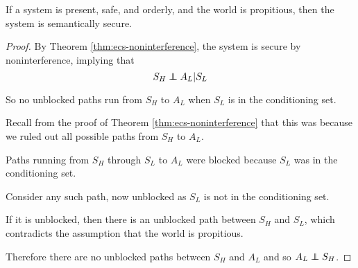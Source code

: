 \documentclass[../thesis.tex]{subfiles}
\begin{document}
\begin{thm}
  \label{thm:semantic}
  If a system is present, safe, and orderly,
  and the world is propitious, then the
  system is semantically secure.
\end{thm}
\begin{proof}
  By Theorem \ref{thm:ecs-noninterference},
  the system is secure by noninterference,
  implying that
  $$S_H \independent A_L \vert S_L$$

  So no unblocked paths run from $S_H$ to $A_L$
  when $S_L$ is in the conditioning set.

  Recall from the proof of
  Theorem \ref{thm:ecs-noninterference}
  that this was because we ruled out all possible
  paths from $S_H$ to $A_L$.

  Paths running from $S_H$ through $S_L$ to $A_L$
  were blocked because $S_L$ was in the conditioning
  set.

  Consider any such path, now unblocked as $S_L$
  is not in the conditioning set.

  If it is unblocked, then there is an unblocked
  path between $S_H$ and $S_L$, which contradicts
  the assumption that the world is propitious.

  Therefore there are no unblocked paths between
  $S_H$ and $A_L$ and so $A_L \independent S_H$.
  
\end{proof}

%
%
\end{document}
